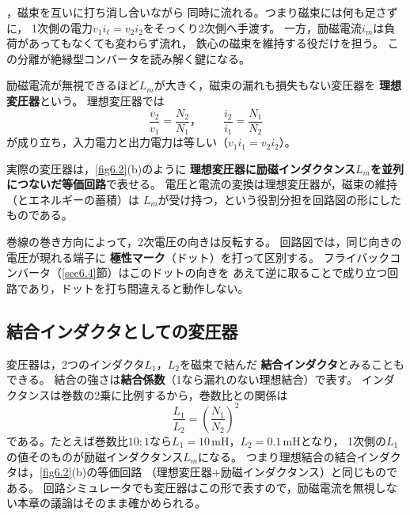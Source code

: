 ，磁束を互いに打ち消し合いながら
同時に流れる。つまり磁束には何も足さずに，
1次側の電力$v_1 i_{\ell} = v_2 i_2$をそっくり2次側へ手渡す。
一方，励磁電流$i_m$は負荷があってもなくても変わらず流れ，
鉄心の磁束を維持する役だけを担う。
この分離が絶縁型コンバータを読み解く鍵になる。

\begin{定義}[理想変圧器]
\label{def6.2}
励磁電流が無視できるほど$L_m$が大きく，磁束の漏れも損失もない変圧器を
\textbf{理想変圧器}という。
理想変圧器では
\begin{equation}
\frac{v_2}{v_1} = \frac{N_2}{N_1}，\qquad
\frac{i_2}{i_1} = \frac{N_1}{N_2}
\label{eq6.7}
\end{equation}
が成り立ち，入力電力と出力電力は等しい（$v_1 i_1 = v_2 i_2$）。
\end{定義}

実際の変圧器は，\ref{fig6.2}(b)のように
\textbf{理想変圧器に励磁インダクタンス$L_m$を並列につないだ等価回路}で表せる。
電圧と電流の変換は理想変圧器が，磁束の維持（とエネルギーの蓄積）は
$L_m$が受け持つ，という役割分担を回路図の形にしたものである。

\begin{注意}
巻線の巻き方向によって，2次電圧の向きは反転する。
回路図では，同じ向きの電圧が現れる端子に
\textbf{極性マーク}（ドット）を打って区別する。
フライバックコンバータ（\ref{sec6.4}節）はこのドットの向きを
あえて逆に取ることで成り立つ回路であり，ドットを打ち間違えると動作しない。
\end{注意}

\subsection{結合インダクタとしての変圧器}

変圧器は，2つのインダクタ$L_1$，$L_2$を磁束で結んだ
\textbf{結合インダクタ}とみることもできる。
結合の強さは\textbf{結合係数}（1なら漏れのない理想結合）で表す。
インダクタンスは巻数の2乗に比例するから，巻数比との関係は
\begin{equation}
\frac{L_1}{L_2} = \left(\frac{N_1}{N_2}\right)^{\!2}
\label{eq6.8}
\end{equation}
である。たとえば巻数比$10:1$なら$L_1 = 10$\,mH，$L_2 = 0.1$\,mHとなり，
1次側の$L_1$の値そのものが励磁インダクタンス$L_m$になる。
つまり理想結合の結合インダクタは，\ref{fig6.2}(b)の等価回路
（理想変圧器$+$励磁インダクタンス）と同じものである。
回路シミュレータでも変圧器はこの形で表すので，励磁電流を無視しない本章の議論はそのまま確かめられる。

